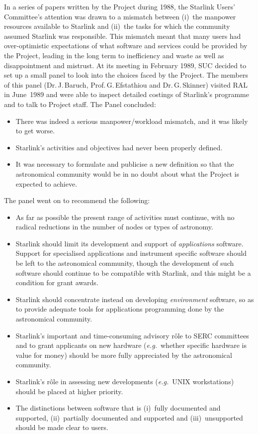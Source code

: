 In a series of papers written by the Project during 1988,
the Starlink Users' Committee's attention was drawn
to a mismatch between
(i)~the manpower resources available to Starlink and
(ii)~the tasks for
which the community
assumed Starlink was responsible.
This mismatch meant that many users had
over-optimistic expectations of what
software and services could be provided by the
Project, leading in the long term to inefficiency and waste
as well as disappointment and mistrust.  At its meeting in
February 1989, SUC decided to set up a small panel
to look into the choices faced by the Project.
The members of this panel
(Dr.\,J.\,Baruch, Prof.\,G.\,Efstathiou and
Dr.\,G.\,Skinner)
visited RAL in June~1989 and were able
to inspect detailed costings of Starlink's programme
and to talk to Project staff.  The Panel concluded:
\begin{itemize}
\item There was indeed a serious manpower/workload mismatch, and it was
likely to get worse.
\item Starlink's activities and objectives had never been properly defined.
\item It was necessary to formulate and publicise a new definition so
that the astronomical
community would be in no doubt about what the Project is expected to achieve.
\end{itemize}
The panel went on to recommend the following:
\begin{itemize}
\item As far as possible
the present range of activities must continue,
with no radical reductions in
the number of nodes or types of astronomy.
\item Starlink should limit its development and support
of {\it applications} software.
Support for specialised
applications and instrument specific software
should be left to the astronomical community, though
the development of such software should continue to
be compatible with Starlink, and this might be a condition for
grant awards.
\item Starlink should concentrate instead on developing
{\it environment} software, so as to provide adequate tools for
applications programming done by the
astronomical community.
\item Starlink's important and
time-consuming advisory r\^{o}le to
SERC committees and to grant applicants on new
hardware ({\it e.g.}\ whether specific hardware
is value for money) should be more fully appreciated
by the astronomical community.
\item Starlink's r\^{o}le in assessing new
developments ({\it e.g.}\ UNIX workstations)
should be placed at higher priority.
\item The distinctions between software that is
(i)~fully documented and supported, (ii)~partially
documented and supported and (iii)~unsupported
should be made clear to users.
\end{itemize}
